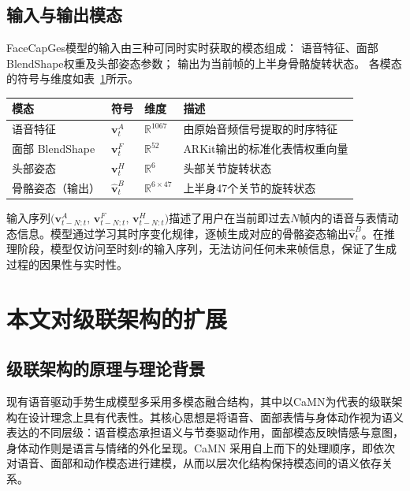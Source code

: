 \subsection{输入与输出模态}

FaceCapGes模型的输入由三种可同时实时获取的模态组成：
语音特征、面部BlendShape权重及头部姿态参数；
输出为当前帧的上半身骨骼旋转状态。
各模态的符号与维度如表~\ref{tab:modalities}所示。

\begin{table}[h]
\centering
\label{tab:modalities}
\begin{tabular}{llll}
\toprule
模态 & 符号 & 维度 & 描述 \\
\midrule
语音特征 & $\bm{v}_t^{A}$ & $\mathbb{R}^{1067}$ & 由原始音频信号提取的时序特征 \\
面部 BlendShape & $\bm{v}_t^{F}$ & $\mathbb{R}^{52}$ & ARKit输出的标准化表情权重向量 \\
头部姿态 & $\bm{v}_t^{H}$ & $\mathbb{R}^{6}$ & 头部关节旋转状态 \\
骨骼姿态（输出） & $\hat{\bm{v}}_t^{B}$ & $\mathbb{R}^{6 \times 47}$ & 上半身47个关节的旋转状态 \\
\bottomrule
\end{tabular}
\end{table}

输入序列$\big(\bm{v}_{t-N:t}^{A},\, \bm{v}_{t-N:t}^{F},\, \bm{v}_{t-N:t}^{H}\big)$描述了用户在当前即过去$N$帧内的语音与表情动态信息。模型通过学习其时序变化规律，逐帧生成对应的骨骼姿态输出$\hat{\bm{v}}_t^{B}$。在推理阶段，模型仅访问至时刻$t$的输入序列，无法访问任何未来帧信息，保证了生成过程的因果性与实时性。

\section{本文对级联架构的扩展}
\label{sec:cascade}

\subsection{级联架构的原理与理论背景}

现有语音驱动手势生成模型多采用多模态融合结构，其中以CaMN\cite{beatcamn}为代表的级联架构在设计理念上具有代表性。其核心思想是将语音、面部表情与身体动作视为语义表达的不同层级：语音模态承担语义与节奏驱动作用，面部模态反映情感与意图，身体动作则是语言与情绪的外化呈现。CaMN 采用自上而下的处理顺序，即依次对语音、面部和动作模态进行建模，从而以层次化结构保持模态间的语义依存关系。

